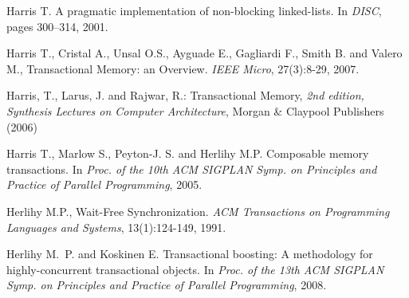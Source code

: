 \begin{thebibliography}{99}
{%

Harris T.
\newblock A pragmatic implementation of non-blocking linked-lists.
\newblock In {\em DISC}, pages 300--314, 2001.






Harris T., Cristal  A., Unsal O.S., Ayguade E., Gagliardi  F., Smith B. and
Valero M., 
Transactional Memory: an Overview. 
{\it IEEE Micro}, 27(3):8-29, 2007. 


% 
% 



 Harris, T.,  Larus, J. and  Rajwar, R.:
Transactional Memory, 
{\it 2nd edition, Synthesis Lectures on Computer Architecture},
Morgan \& Claypool Publishers (2006)



Harris T., Marlow S., Peyton-J. S. and Herlihy M.P.
\newblock Composable memory transactions.
\newblock In {\em Proc. of the 10th ACM SIGPLAN Symp. on Principles and
  Practice of Parallel Programming}, 2005.




Herlihy M.P., 
Wait-Free Synchronization. 
{\it ACM Transactions on Programming Languages and Systems}, 
13(1):124-149, 1991. 



Herlihy M.~P. and Koskinen E.
\newblock Transactional boosting: A methodology for highly-concurrent
  transactional objects.
\newblock In {\em Proc. of the 13th ACM SIGPLAN Symp. on Principles and
  Practice of Parallel Programming}, 2008.

}
\end{thebibliography}
